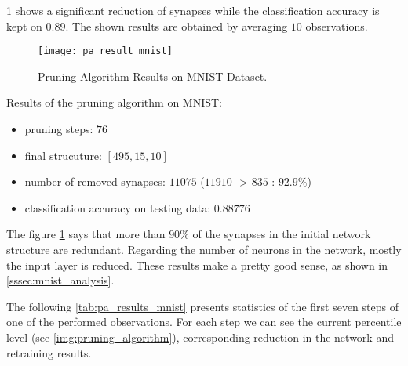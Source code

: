 \cref{fig:pa_result_mnist} shows a significant reduction of synapses while the classification accuracy is kept on $ 0.89 $. The shown results are obtained by averaging $ 10 $ observations.
\begin{figure}[H]
  \centering
  \texttt{[image: pa\_result\_mnist]}
  \caption{Pruning Algorithm Results on MNIST Dataset.}
  \label{fig:pa_result_mnist}
\end{figure}

Results of the pruning algorithm on MNIST:
\begin{itemize}
\item pruning steps: $ 76 $
\item final strucuture: $ [495, 15, 10] $
\item number of removed synapses: $ 11075 $ ($ 11910 $ -> $ 835 $ : $ 92.9\% $)
\item classification accuracy on testing data: $ 0.88776 $
\end{itemize}

The figure \ref{fig:pa_result_mnist} says that more than $ 90\% $ of the synapses in the initial network structure are redundant. Regarding the number of neurons in the network, mostly the input layer is reduced. These results make a pretty good sense, as shown in \cref{sssec:mnist_analysis}.

The following \cref{tab:pa_results_mnist} presents statistics of the first seven steps of one of the performed observations. For each step we can see the current percentile level (see \cref{img:pruning_algorithm}), corresponding reduction in the network and retraining results.

